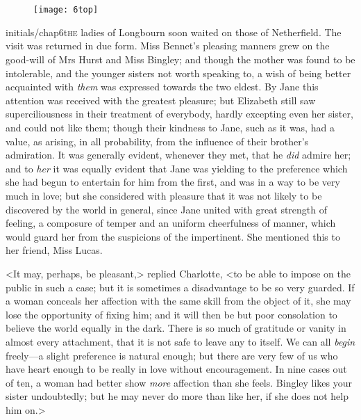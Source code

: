 \chapter[Chapter \thechapter]{}
\begin{figure}[t!]
\centering
\texttt{[image: 6top]}
\end{figure}

\lettrine[lines=6,image=true]{initials/chap6t}{he}  ladies of Longbourn soon waited on those of Netherfield. The visit was returned in due form. Miss Bennet's pleasing manners grew on the good-will of Mrs Hurst and Miss Bingley; and though the mother was found to be intolerable, and the younger sisters not worth speaking to, a wish of being better acquainted with \textit{them} was expressed towards the two eldest. By Jane this attention was received with the greatest pleasure; but Elizabeth still saw superciliousness in their treatment of everybody, hardly excepting even her sister, and could not like them; though their kindness to Jane, such as it was, had a value, as arising, in all probability, from the influence of their brother's admiration. It was generally evident, whenever they met, that he \textit{did} admire her; and to \textit{her} it was equally evident that Jane was yielding to the preference which she had begun to entertain for him from the first, and was in a way to be very much in love; but she considered with pleasure that it was not likely to be discovered by the world in general, since Jane united with great strength of feeling, a composure of temper and an uniform cheerfulness of manner, which would guard her from the suspicions of the impertinent. She mentioned this to her friend, Miss Lucas.

<It may, perhaps, be pleasant,> replied Charlotte, <to be able to impose on the public in such a case; but it is sometimes a disadvantage to be so very guarded. If a woman conceals her affection with the same skill from the object of it, she may lose the opportunity of fixing him; and it will then be but poor consolation to believe the world equally in the dark. There is so much of gratitude or vanity in almost every attachment, that it is not safe to leave any to itself. We can all \textit{begin} freely—a slight preference is natural enough; but there are very few of us who have heart enough to be really in love without encouragement. In nine cases out of ten, a woman had better show \textit{more} affection than she feels. Bingley likes your sister undoubtedly; but he may never do more than like her, if she does not help him on.>

